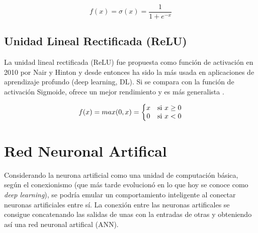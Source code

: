 \begin{equation}
 f(x) = \sigma (x) = \frac{1}{1+e^{-x}}
\end{equation}



\subsection{Unidad Lineal Rectificada (ReLU)}\label{subsubsec:relu}

La unidad lineal rectificada (ReLU) fue propuesta como función de activación en 2010 por Nair y Hinton \cite{Nair2010} y desde entonces ha sido la más usada en aplicaciones de aprendizaje profundo (deep learning, DL). Si se compara con la función de activación Sigmoide, ofrece un mejor rendimiento y es más generalista \cite{nwankpa2018activation}.

\begin{equation}
 f(x) = max(0, x)=\left\{\begin{matrix}
 x & $si $ x \geq 0 \\ 
 0 & $si $ x < 0
\end{matrix}\right.
\end{equation}

\newpage\section{Red Neuronal Artifical}\label{subsec:neural_network}

Considerando la neurona artificial como una unidad de computación básica, según el conexionismo (que más tarde evolucionó en lo que hoy se conoce como \textit{deep learning}), se podría emular un comportamiento inteligente al conectar neuronas artificiales entre sí. La conexión entre las neuronas artificales se consigue concatenando las salidas de unas con la entradas de otras y obteniendo así una red neuronal artifical (ANN).


